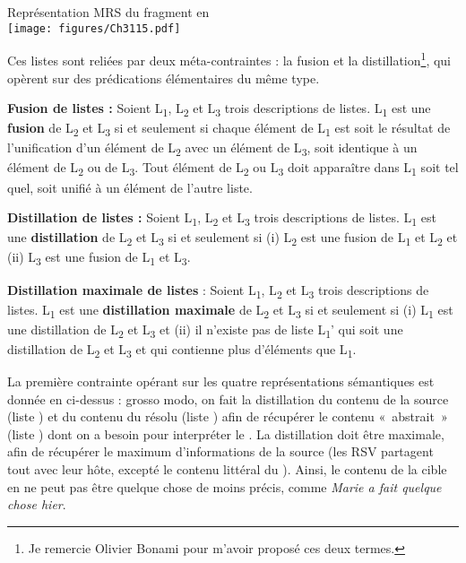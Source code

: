    
\ea \label{ch3:ex115}
Représentation MRS du fragment en \\
\texttt{[image: figures/Ch3115.pdf]} 
\z

Ces listes sont reliées par deux méta-contraintes : la fusion et la distillation\footnote{Je remercie Olivier Bonami pour m’avoir proposé ces deux termes.}, qui opèrent sur des prédications élémentaires du même type. 

\textbf{Fusion de listes :} Soient L\textsubscript{1}, L\textsubscript{2} et L\textsubscript{3} trois descriptions de listes. L\textsubscript{1} est une \textbf{fusion} de L\textsubscript{2} et L\textsubscript{3} si et seulement si chaque élément de L\textsubscript{1} est soit le résultat de l’unification d’un élément de L\textsubscript{2} avec un élément de L\textsubscript{3}, soit identique à un élément de L\textsubscript{2} ou de L\textsubscript{3}. Tout élément de L\textsubscript{2} ou L\textsubscript{3} doit apparaître dans L\textsubscript{1} soit tel quel, soit unifié à un élément de l’autre liste. 

\textbf{Distillation de listes :} Soient L\textsubscript{1}, L\textsubscript{2} et L\textsubscript{3} trois descriptions de listes. L\textsubscript{1} est une \textbf{distillation} de L\textsubscript{2} et L\textsubscript{3} si et seulement si (i) L\textsubscript{2} est une fusion de L\textsubscript{1} et L\textsubscript{2} et (ii) L\textsubscript{3} est une fusion de L\textsubscript{1} et L\textsubscript{3}.

\textbf{Distillation maximale de listes} : Soient L\textsubscript{1}, L\textsubscript{2} et L\textsubscript{3} trois descriptions de listes. L\textsubscript{1} est une \textbf{distillation maximale} de L\textsubscript{2} et L\textsubscript{3} si et seulement si (i) L\textsubscript{1} est une distillation de L\textsubscript{2} et L\textsubscript{3} et (ii) il n’existe pas de liste L\textsubscript{1}' qui soit une distillation de L\textsubscript{2} et L\textsubscript{3} et qui contienne plus d’éléments que L\textsubscript{1}.

La première contrainte opérant sur les quatre représentations sémantiques est donnée en  ci-dessus : grosso modo, on fait la distillation du contenu de la source (liste ) et du contenu du  résolu (liste ) afin de récupérer le contenu «~abstrait~» (liste ) dont on a besoin pour interpréter le . La distillation doit être maximale, afin de récupérer le maximum d’informations de la source (les RSV partagent tout avec leur hôte, excepté le contenu littéral du ). Ainsi, le contenu de la cible en  ne peut pas être quelque chose de moins précis, comme \textit{Marie a fait quelque chose hier}. 

